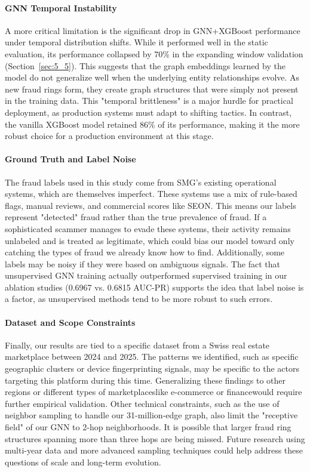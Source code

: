 \paragraph{GNN Temporal Instability}

A more critical limitation is the significant drop in GNN+XGBoost performance under temporal distribution shifts. While it performed well in the static evaluation, its performance collapsed by 70\% in the expanding window validation (Section~\ref{sec:5_5}). This suggests that the graph embeddings learned by the model do not generalize well when the underlying entity relationships evolve. As new fraud rings form, they create graph structures that were simply not present in the training data. This "temporal brittleness" is a major hurdle for practical deployment, as production systems must adapt to shifting tactics. In contrast, the vanilla XGBoost model retained 86\% of its performance, making it the more robust choice for a production environment at this stage.

\paragraph{Ground Truth and Label Noise}

The fraud labels used in this study come from SMG’s existing operational systems, which are themselves imperfect. These systems use a mix of rule-based flags, manual reviews, and commercial scores like SEON. This means our labels represent "detected" fraud rather than the true prevalence of fraud. If a sophisticated scammer manages to evade these systems, their activity remains unlabeled and is treated as legitimate, which could bias our model toward only catching the types of fraud we already know how to find. Additionally, some labels may be noisy if they were based on ambiguous signals. The fact that unsupervised GNN training actually outperformed supervised training in our ablation studies (0.6967 vs. 0.6815 AUC-PR) supports the idea that label noise is a factor, as unsupervised methods tend to be more robust to such errors.

\paragraph{Dataset and Scope Constraints}

Finally, our results are tied to a specific dataset from a Swiss real estate marketplace between 2024 and 2025. The patterns we identified, such as specific geographic clusters or device fingerprinting signals, may be specific to the actors targeting this platform during this time. Generalizing these findings to other regions or different types of marketplaceslike e-commerce or financewould require further empirical validation. Other technical constraints, such as the use of neighbor sampling to handle our 31-million-edge graph, also limit the "receptive field" of our GNN to 2-hop neighborhoods. It is possible that larger fraud ring structures spanning more than three hops are being missed. Future research using multi-year data and more advanced sampling techniques could help address these questions of scale and long-term evolution.

